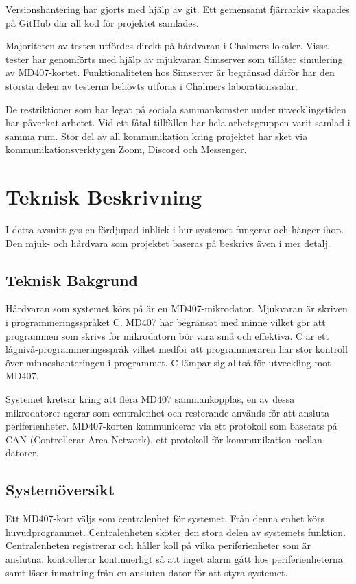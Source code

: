 \documentclass[a4paper]{article}
\begin{document}
Versionshantering har gjorts med hjälp av git.
Ett gemensamt fjärrarkiv skapades på GitHub där all kod för projektet samlades.

Majoriteten av testen utfördes direkt på hårdvaran i Chalmers lokaler.
Vissa tester har genomförts med hjälp av mjukvaran Simserver som tillåter simulering av MD407-kortet.
Funktionaliteten hos Simserver är begränsad därför har den största delen av testerna behövts utföras i Chalmers laborationssalar.

De restriktioner som har legat på sociala sammankomster under utvecklingstiden har påverkat arbetet. Vid ett fåtal tillfällen har hela arbetsgruppen varit samlad i samma rum.
Stor del av all kommunikation kring projektet har sket via kommunikationsverktygen Zoom, Discord och Messenger.



\section{Teknisk Beskrivning}
I detta avsnitt ges en fördjupad inblick i hur systemet fungerar och hänger ihop.
Den mjuk- och hårdvara som projektet baseras på beskrivs även i mer detalj.

\subsection{Teknisk Bakgrund}
Hårdvaran som systemet körs på är en MD407-mikrodator.
Mjukvaran är skriven i programmeringsspråket C.
MD407 har begränsat med minne vilket gör att programmen som skrivs för mikrodatorn bör vara små och effektiva.
C är ett lågnivå-programmeringsspråk vilket medför att programmeraren har stor kontroll över minneshanteringen i programmet.
C lämpar sig alltså för utveckling mot MD407.

Systemet kretsar kring att flera MD407 sammankopplas, en av dessa mikrodatorer agerar som centralenhet och resterande används för att ansluta periferienheter.
MD407-korten kommunicerar via ett protokoll som baserats på CAN (Controllerar Area Network), ett protokoll för kommunikation mellan datorer.

\subsection{Systemöversikt}

Ett MD407-kort väljs som centralenhet för systemet.
Från denna enhet körs huvudprogrammet.
Centralenheten sköter den stora delen av systemets funktion.
Centralenheten registrerar och håller koll på vilka periferienheter som är anslutna, kontrollerar kontinuerligt så att inget alarm gått hos periferienheterna samt läser inmatning från en ansluten dator för att styra systemet.
\end{document}

